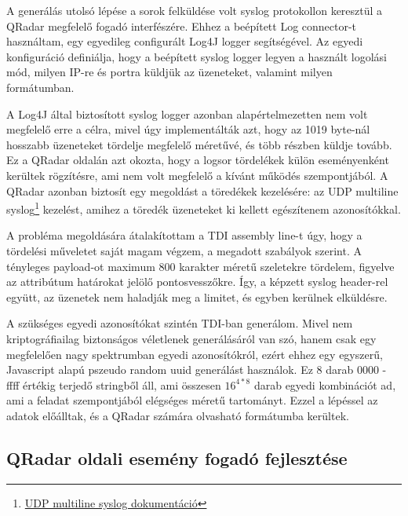


A generálás utolsó lépése a sorok felküldése volt syslog protokollon keresztül a QRadar megfelelő fogadó interfészére. Ehhez a beépített Log connector-t használtam, egy egyedileg configurált Log4J logger segítségével. Az egyedi konfiguráció definiálja, hogy a beépített syslog logger legyen a használt logolási mód, milyen IP-re és portra küldjük az üzeneteket, valamint milyen formátumban.

A Log4J által biztosított syslog logger azonban alapértelmezetten nem volt megfelelő erre a célra, mivel úgy implementálták azt, hogy az 1019 byte-nál hosszabb üzeneteket tördelje megfelelő méretűvé, és több részben küldje tovább. Ez a QRadar oldalán azt okozta, hogy a logsor tördelékek külön eseményenként kerültek rögzítésre, ami nem volt megfelelő a kívánt működés szempontjából. A QRadar azonban biztosít egy megoldást a töredékek kezelésére: az UDP multiline syslog\footnote{ \href{https://www.ibm.com/support/knowledgecenter/SS42VS_7.2.2/com.ibm.qradar.doc_7.2.2/t_logsource_UDPmultiprotocol.html}{UDP multiline syslog dokumentáció}} kezelést, amihez a töredék üzeneteket ki kellett egészítenem azonosítókkal.

A probléma megoldására átalakítottam a TDI assembly line-t úgy, hogy a tördelési műveletet saját magam végzem, a megadott szabályok szerint. A tényleges payload-ot maximum 800 karakter méretű szeletekre tördelem, figyelve az attribútum határokat jelölő pontosvesszőkre. Így, a képzett syslog header-rel együtt, az üzenetek nem haladják meg a limitet, és egyben kerülnek elküldésre. 

A szükséges egyedi azonosítókat szintén TDI-ban generálom. Mivel nem kriptográfiailag biztonságos véletlenek generálásáról van szó, hanem csak egy megfelelően nagy spektrumban egyedi azonosítókról, ezért ehhez egy egyszerű, Javascript alapú pszeudo random uuid generálást használok. Ez 8 darab 0000 - ffff értékig terjedő stringből áll, ami összesen $16^{4 * 8} $ darab egyedi kombinációt ad, ami a feladat szempontjából elégséges méretű tartományt. Ezzel a lépéssel az adatok előálltak, és a QRadar számára olvasható formátumba kerültek.


\subsection{QRadar oldali esemény fogadó fejlesztése}

